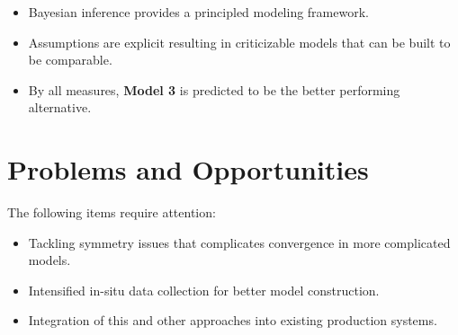 \documentclass[a0,portrait]{a0poster}
\begin{document}
\begin{multicols}{2}
\begin{itemize}
    \item Bayesian inference provides a principled modeling framework.
    \item Assumptions are explicit resulting in criticizable models that can be built to be comparable.
    \item By all measures, \textbf{Model 3} is predicted to be the better performing alternative.
\end{itemize}

\color{DarkSlateGray} %


\section*{Problems and Opportunities}

The following items require attention:
\begin{itemize}
    \item Tackling symmetry issues that complicates convergence in more complicated models.
    \item Intensified in-situ data collection for better model construction.
    \item Integration of this and other approaches into existing production systems.
\end{itemize}


 



\end{multicols}
\end{document}
